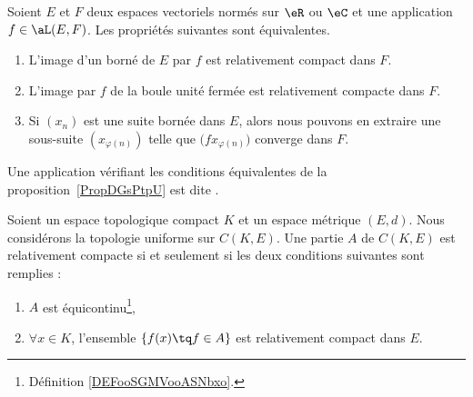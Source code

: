 \begin{proposition} \label{PropDGsPtpU}
    Soient \( E\) et \( F\) deux espaces vectoriels normés sur \( \eR\) ou \( \eC\) et une application \( f\in\aL(E,F)\). Les propriétés suivantes sont équivalentes.
    \begin{enumerate}
        \item
            L'image d'un borné de \( E\) par \( f\) est relativement compact dans \( F\).
        \item   \label{ItemJIkpUbLii}
            L'image par \( f\) de la boule unité fermée est relativement compacte dans \( F\).
        \item
            Si \( (x_n)\) est une suite bornée dans \( E\), alors nous pouvons en extraire une sous-suite \( (x_{\varphi(n)})\) telle que \( \big( fx_{\varphi(n)} \big)\) converge dans \( F\).
    \end{enumerate}
\end{proposition}

\begin{definition}
    Une application vérifiant les conditions équivalentes de la proposition~\ref{PropDGsPtpU} est dite .
\end{definition}

\begin{theorem}        \label{ThoKRbtpah}
    Soient un espace topologique compact \( K\) et un espace métrique \( (E,d)\). Nous considérons la topologie uniforme sur \( C(K,E)\). Une partie \( A\) de \( C(K,E)\) est relativement compacte si et seulement si les deux conditions suivantes sont remplies :
    \begin{enumerate}
        \item
            \( A\) est équicontinu\footnote{Définition \ref{DEFooSGMVooASNbxo}.},
        \item
            \( \forall x\in K\), l'ensemble \( \{ f(x)\tq f\in A \}\) est relativement compact dans \( E\).
    \end{enumerate}
\end{theorem}

